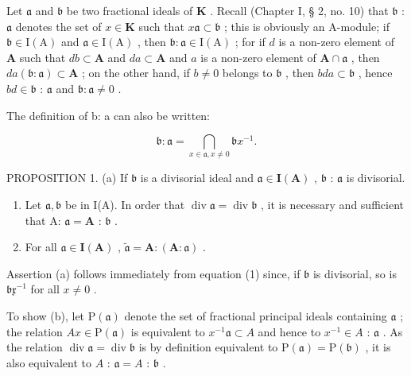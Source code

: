 Let \(\mathfrak{a}\) and \(\mathfrak{b}\) be two fractional ideals of \(\mathbf{K}\) . Recall (Chapter I, § 2, no. 10) that \(\mathfrak{b}\) : \(\mathfrak{a}\) denotes the set of \(x \in \mathbf{K}\) such that \(x\mathfrak{a} \subset \mathfrak{b}\) ; this is obviously an A-module; if \(\mathfrak{b} \in \mathrm{I}(\mathrm{A})\) and \(\mathfrak{a} \in \mathrm{I}(\mathrm{A})\) , then \(\mathfrak{b} \colon \mathfrak{a} \in \mathrm{I}(\mathrm{A})\) ; for if \(d\) is a non-zero element of \(\mathbf{A}\) such that \(db \subset \mathbf{A}\) and \(da \subset \mathbf{A}\) and \(a\) is a non-zero element of \(\mathbf{A} \cap \mathfrak{a}\) , then \(da(\mathfrak{b} : \mathfrak{a}) \subset \mathbf{A}\) ; on the other hand, if \(b \neq 0\) belongs to \(\mathfrak{b}\) , then \(bda \subset \mathfrak{b}\) , hence \(bd \in \mathfrak{b}\) : \(\mathfrak{a}\) and \(\mathfrak{b} : \mathfrak{a} \neq 0\) .

The definition of b: a can also be written:

\[
\mathfrak {b}: \mathfrak {a} = \bigcap_ {x \in \mathfrak {a}, x \neq 0} \mathfrak {b} x ^ {- 1}.\tag{1}
\]

PROPOSITION 1. (a) If \(\mathfrak{b}\) is a divisorial ideal and \(\mathfrak{a} \in \mathbf{I}(\mathbf{A})\) , \(\mathfrak{b}\) : \(\mathfrak{a}\) is divisorial.

\begin{enumerate}
\def\labelenumi{(\alph{enumi})}
\setcounter{enumi}{1}
\item
  Let \(\mathfrak{a},\mathfrak{b}\) be in I(A). In order that \(\operatorname {div}\mathfrak{a} = \operatorname {div}\mathfrak{b}\) , it is necessary and sufficient that A: \(\mathfrak{a} = \mathbf{A}\) : \(\mathfrak{b}\) .
\item
  For all \(\mathfrak{a} \in \mathbf{I}(\mathbf{A})\) , \(\tilde{\mathfrak{a}} = \mathbf{A} : (\mathbf{A} : \mathfrak{a})\) .
\end{enumerate}

Assertion (a) follows immediately from equation (1) since, if \(\mathfrak{b}\) is divisorial, so is \(\mathfrak{bx}^{-1}\) for all \(x \neq 0\) .

To show (b), let \(\mathrm{P}(\mathfrak{a})\) denote the set of fractional principal ideals containing \(\mathfrak{a}\) ; the relation \(Ax \in \mathrm{P}(\mathfrak{a})\) is equivalent to \(x^{-1}\mathfrak{a} \subset A\) and hence to \(x^{-1} \in A\) : \(\mathfrak{a}\) . As the relation \(\operatorname{div} \mathfrak{a} = \operatorname{div} \mathfrak{b}\) is by definition equivalent to \(\mathrm{P}(\mathfrak{a}) = \mathrm{P}(\mathfrak{b})\) , it is also equivalent to \(A\) : \(\mathfrak{a} = A\) : \(\mathfrak{b}\) .

